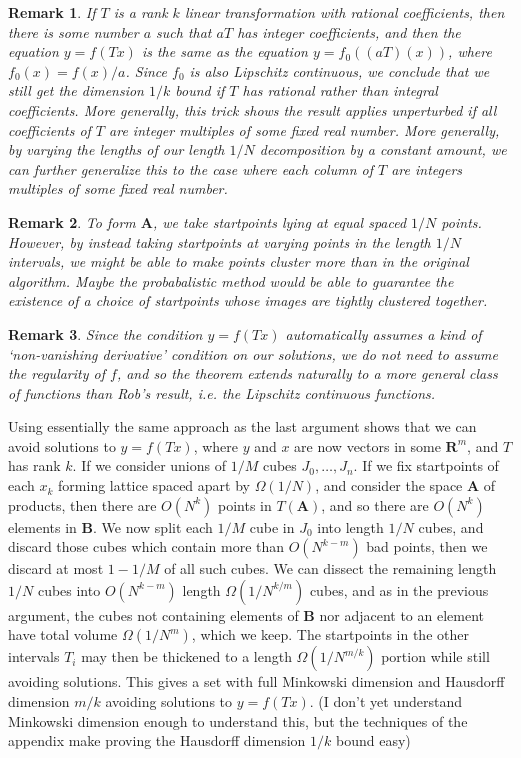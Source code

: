 \documentclass{report}
\theoremstyle{plain}
\theoremstyle{plain}
\newtheorem*{remark}{Remark}
\begin{document}
\begin{remark}
    If $T$ is a rank $k$ linear transformation with rational coefficients, then there is some number $a$ such that $aT$ has integer coefficients, and then the equation $y = f(Tx)$ is the same as the equation $y = f_0((aT)(x))$, where $f_0(x) = f(x)/a$. Since $f_0$ is also Lipschitz continuous, we conclude that we still get the dimension $1/k$ bound if $T$ has rational rather than integral coefficients. More generally, this trick shows the result applies unperturbed if all coefficients of $T$ are integer multiples of some fixed real number. More generally, by varying the lengths of our length $1/N$ decomposition by a constant amount, we can further generalize this to the case where each column of $T$ are integers multiples of some fixed real number.
\end{remark}

\begin{remark}
    To form $\mathbf{A}$, we take startpoints lying at equal spaced $1/N$ points. However, by instead taking startpoints at varying points in the length $1/N$ intervals, we might be able to make points cluster more than in the original algorithm. Maybe the probabalistic method would be able to guarantee the existence of a choice of startpoints whose images are tightly clustered together.
\end{remark}

\begin{remark}
    Since the condition $y = f(Tx)$ automatically assumes a kind of `non-vanishing derivative' condition on our solutions, we do not need to assume the regularity of $f$, and so the theorem extends naturally to a more general class of functions than Rob's result, i.e. the Lipschitz continuous functions.
\end{remark}

Using essentially the same approach as the last argument shows that we can avoid solutions to $y = f(Tx)$, where $y$ and $x$ are now vectors in some $\mathbf{R}^m$, and $T$ has rank $k$. If we consider unions of $1/M$ cubes $J_0, \dots, J_n$. If we fix startpoints of each $x_k$ forming lattice spaced apart by $\Omega(1/N)$, and consider the space $\mathbf{A}$ of products, then there are $O(N^k)$ points in $T(\mathbf{A})$, and so there are $O(N^k)$ elements in $\mathbf{B}$. We now split each $1/M$ cube in $J_0$ into length $1/N$ cubes, and discard those cubes which contain more than $O(N^{k-m})$ bad points, then we discard at most $1 - 1/M$ of all such cubes. We can dissect the remaining length $1/N$ cubes into $O(N^{k-m})$ length $\Omega(1/N^{k/m})$ cubes, and as in the previous argument, the cubes not containing elements of $\mathbf{B}$ nor adjacent to an element have total volume $\Omega(1/N^m)$, which we keep. The startpoints in the other intervals $T_i$ may then be thickened to a length $\Omega(1/N^{m/k})$ portion while still avoiding solutions. This gives a set with full Minkowski dimension and Hausdorff dimension $m/k$ avoiding solutions to $y = f(Tx)$. (I don't yet understand Minkowski dimension enough to understand this, but the techniques of the appendix make proving the Hausdorff dimension $1/k$ bound easy)
\end{document}
